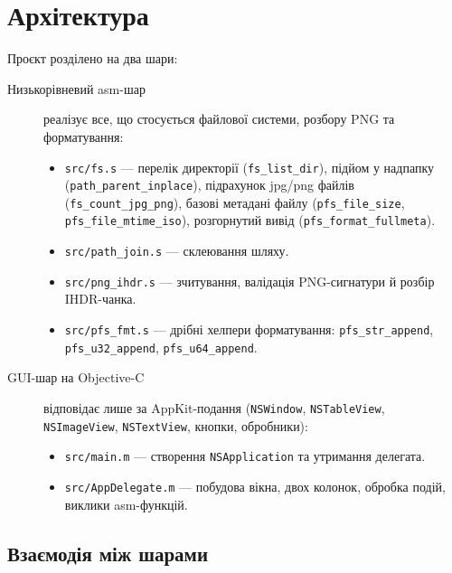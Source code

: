 \documentclass[12pt,a4paper]{article}
\begin{document}
\section{Архітектура}

Проєкт розділено на два шари:

\begin{description}
  \item[Низькорівневий asm-шар] реалізує все, що стосується файлової
        системи, розбору PNG та форматування:
        \begin{itemize}
          \item \texttt{src/fs.s} --- перелік директорії (\texttt{fs\_list\_dir}),
                підйом у надпапку (\texttt{path\_parent\_inplace}),
                підрахунок jpg/png файлів (\texttt{fs\_count\_jpg\_png}),
                базові метадані файлу (\texttt{pfs\_file\_size},
                \texttt{pfs\_file\_mtime\_iso}), розгорнутий вивід
                (\texttt{pfs\_format\_fullmeta}).
          \item \texttt{src/path\_join.s} --- склеювання шляху.
          \item \texttt{src/png\_ihdr.s} --- зчитування, валідація
                PNG-сигнатури й розбір IHDR-чанка.
          \item \texttt{src/pfs\_fmt.s} --- дрібні хелпери форматування:
                \texttt{pfs\_str\_append}, \texttt{pfs\_u32\_append},
                \texttt{pfs\_u64\_append}.
        \end{itemize}
  \item[GUI-шар на Objective-C] відповідає лише за AppKit-подання
        (\texttt{NSWindow}, \texttt{NSTableView}, \texttt{NSImageView},
        \texttt{NSTextView}, кнопки, обробники):
        \begin{itemize}
          \item \texttt{src/main.m} --- створення \texttt{NSApplication}
                та утримання делегата.
          \item \texttt{src/AppDelegate.m} --- побудова вікна,
                двох колонок, обробка подій, виклики asm-функцій.
        \end{itemize}
\end{description}

\subsection{Взаємодія між шарами}
\end{document}
